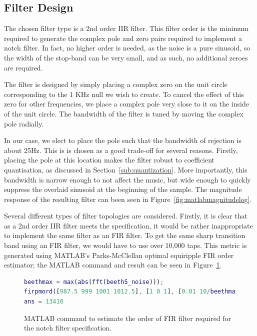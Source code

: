 \documentclass[]{article}
\begin{document}
\subsection{Filter Design} %
\label{sub:filter_design}

The chosen filter type is a 2nd order IIR filter. This filter order is the minimum required to generate the complex pole and zero pairs required to implement a notch filter. In fact, no higher order is needed, as the noise is a pure sinusoid, so the width of the stop-band can be very small, and as such, no additional zeroes are required.

The filter is designed by simply placing a complex zero on the unit circle corresponding to the 1 KHz null we wish to create. To cancel the effect of this zero for other frequencies, we place a complex pole very close to it on the inside of the unit circle. The bandwidth of the filter is tuned by moving the complex pole radially.

In our case, we elect to place the pole such that the bandwidth of rejection is about 25Hz. This is is chosen as a good trade-off for several reasons. Firstly, placing the pole at this location makes the filter robust to coefficient quantisation, as discussed in Section~\ref{sub:quantization}.
More importantly, this bandwidth is narrow enough to not affect the music, but wide enough to quickly suppress the overlaid sinusoid at the beginning of the sample.
The magnitude response of the resulting filter can been seen in Figure~\ref{fig:matlabmagnitudelog}.

Several different types of filter topologies are considered. Firstly, it is clear that as a 2nd order IIR filter meets the specification, it would be rather inappropriate to implement the same filter as an FIR filter. To get the same sharp transition band using an FIR filter, we would have to use over 10,000 taps.
This metric is generated using MATLAB's Parks-McClellan optimal equiripple FIR order estimator; the MATLAB command and result can be seen in Figure~\ref{fig:firpmord}.

\begin{figure}[bp]
	\begin{center}
		\begin{lstlisting}[language = Matlab]
beethmax = max(abs(fft(beeth5_noise)));
firpmord([987.5 999 1001 1012.5], [1 0 1], [0.01 10/beethmax 0.01], 44100)
ans = 13410
		\end{lstlisting}
	\end{center}
	\caption{MATLAB command to estimate the order of FIR filter required for the notch filter specification.}
	\label{fig:firpmord}
\end{figure}
\end{document}
